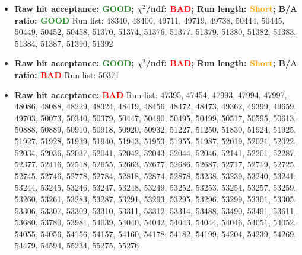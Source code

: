 \documentclass{article}
\begin{document}
\begin{itemize}
\item \textbf{Raw hit acceptance: \textcolor{ForestGreen}{GOOD}; $\chi^{2}$/ndf: \textcolor{Red}{BAD}; Run length: \textcolor{Orange}{Short}; B/A ratio: \textcolor{ForestGreen}{GOOD}} \newline
Run list: 48340, 48400, 49711, 49719, 49738, 50444, 50445, 50449, 50452, 50458, 51370, 51374, 51376, 51377, 51379, 51380, 51382, 51383, 51384, 51387, 51390, 51392

\item \textbf{Raw hit acceptance: \textcolor{ForestGreen}{GOOD}; $\chi^{2}$/ndf: \textcolor{Red}{BAD}; Run length: \textcolor{Orange}{Short}; B/A ratio: \textcolor{Red}{BAD}} \newline
Run list: 50371

\item \textbf{Raw hit acceptance: \textcolor{Red}{BAD}} \newline
Run list: 47395, 47454, 47993, 47994, 47997, 48086, 48088, 48229, 48324, 48419, 48456, 48472, 48473, 49362, 49399, 49659, 49703, 50073, 50340, 50379, 50447, 50490, 50495, 50499, 50517, 50595, 50613, 50888, 50889, 50910, 50918, 50920, 50932, 51227, 51250, 51830, 51924, 51925, 51927, 51928, 51939, 51940, 51943, 51953, 51955, 51987, 52019, 52021, 52022, 52034, 52036, 52037, 52041, 52042, 52043, 52044, 52046, 52141, 52201, 52287, 52377, 52416, 52518, 52655, 52663, 52677, 52686, 52687, 52717, 52719, 52725, 52745, 52746, 52778, 52784, 52818, 52874, 52878, 53238, 53239, 53240, 53241, 53244, 53245, 53246, 53247, 53248, 53249, 53252, 53253, 53254, 53257, 53259, 53260, 53261, 53283, 53287, 53291, 53293, 53295, 53296, 53299, 53301, 53305, 53306, 53307, 53309, 53310, 53311, 53312, 53314, 53488, 53490, 53491, 53611, 53680, 53780, 53981, 54039, 54040, 54042, 54043, 54044, 54046, 54051, 54052, 54055, 54056, 54156, 54157, 54160, 54178, 54182, 54199, 54204, 54239, 54269, 54479, 54594, 55234, 55275, 55276


\end{itemize}
\end{document}

